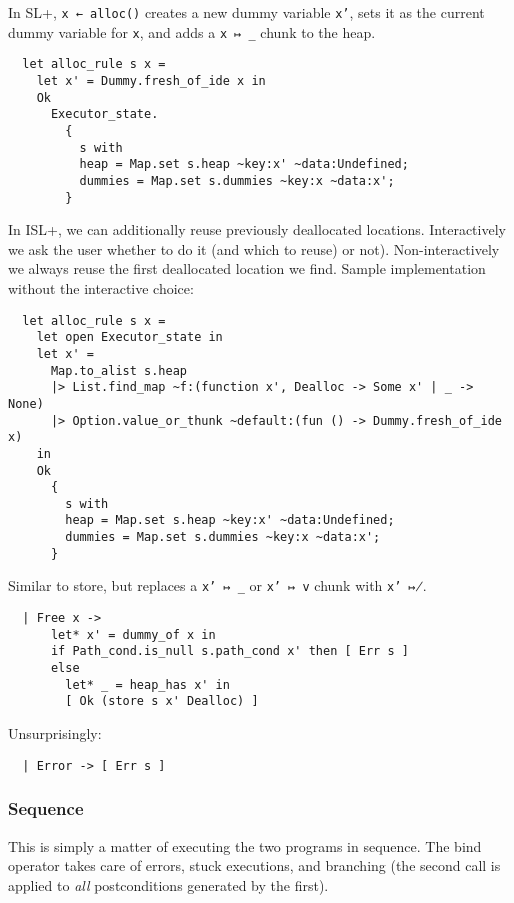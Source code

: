 \documentclass[parskip=half]{scrartcl}
\begin{document}
In SL+, \texttt{x ← alloc()} creates a new dummy variable \texttt{x'}, sets it as the current dummy variable for \texttt{x}, and adds a \texttt{x ↦ \_} chunk to the heap.

\begin{verbatim}
  let alloc_rule s x =
    let x' = Dummy.fresh_of_ide x in
    Ok
      Executor_state.
        {
          s with
          heap = Map.set s.heap ~key:x' ~data:Undefined;
          dummies = Map.set s.dummies ~key:x ~data:x';
        }
\end{verbatim}

In ISL+, we can additionally reuse previously deallocated locations. Interactively we ask the user whether to do it (and which to reuse) or not). Non-interactively we always reuse the first deallocated location we find. Sample implementation without the interactive choice:

\begin{verbatim}
  let alloc_rule s x =
    let open Executor_state in
    let x' =
      Map.to_alist s.heap
      |> List.find_map ~f:(function x', Dealloc -> Some x' | _ -> None)
      |> Option.value_or_thunk ~default:(fun () -> Dummy.fresh_of_ide x)
    in
    Ok
      {
        s with
        heap = Map.set s.heap ~key:x' ~data:Undefined;
        dummies = Map.set s.dummies ~key:x ~data:x';
      }
\end{verbatim}


Similar to store, but replaces a \texttt{x' ↦ \_} or \texttt{x' ↦ v} chunk with \texttt{x' ↦̸}.

\begin{verbatim}
  | Free x ->
      let* x' = dummy_of x in
      if Path_cond.is_null s.path_cond x' then [ Err s ]
      else
        let* _ = heap_has x' in
        [ Ok (store s x' Dealloc) ]
\end{verbatim}


Unsurprisingly:

\begin{verbatim}
  | Error -> [ Err s ]
\end{verbatim}

\subsubsection{Sequence}

This is simply a matter of executing the two programs in sequence. The bind operator takes care of errors, stuck executions, and branching (the second  call is applied to \emph{all} postconditions generated by the first).
\end{document}
